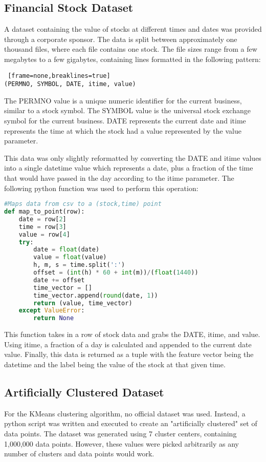 \documentclass[9pt,twocolumn,twoside]{idsi}
\begin{document}
\subsection{Financial Stock Dataset}
A dataset containing the value of stocks at different times and dates was provided through a corporate sponsor. The data is split between approximately one thousand files, where each file contains one stock. The file sizes range from a few megabytes to a few gigabytes, containing lines formatted in the following pattern:
\begin{lstlisting} [frame=none,breaklines=true]
(PERMNO, SYMBOL, DATE, itime, value)
\end{lstlisting}
The PERMNO value is a unique numeric identifier for the current business, similar to a stock symbol. The SYMBOL value is the universal stock exchange symbol for the current business. DATE represents the current date and itime represents the time at which the stock had a value represented by the value parameter.

This data was only slightly reformatted by converting the DATE and itime values into a single datetime value which represents a date, plus a fraction of the time that would have passed in the day according to the itime parameter. The following python function was used to perform this operation:
\begin{lstlisting}[language=Python, breaklines=true]
#Maps data from csv to a (stock,time) point
def map_to_point(row):
    date = row[2]
    time = row[3]
    value = row[4]
    try:
        date = float(date)
        value = float(value)
        h, m, s = time.split(':')
        offset = (int(h) * 60 + int(m))/(float(1440))
        date += offset
        time_vector = []
        time_vector.append(round(date, 1))
        return (value, time_vector)
    except ValueError:
        return None
\end{lstlisting}

This function takes in a row of stock data and grabs the DATE, itime, and value. Using itime, a fraction of a day is calculated and appended to the current date value. Finally, this data is returned as a tuple with the feature vector being the datetime and the label being the value of the stock at that given time. 

\subsection{Artificially Clustered Dataset}
For the KMeans clustering algorithm, no official dataset was used. Instead, a python script was written and executed to create an "artificially clustered" \cite{clustering} set of data points. The dataset was generated using 7 cluster centers, containing 1,000,000 data points. However, these values were picked arbitrarily as any number of clusters and data points would work. 
\end{document}
